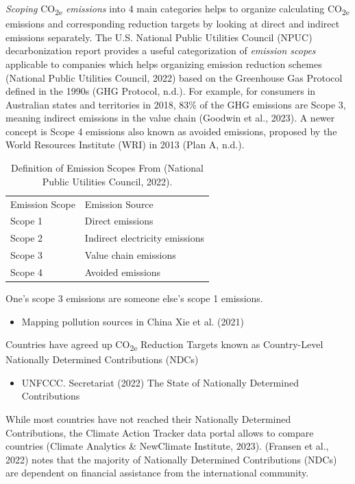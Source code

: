 \documentclass[
  letterpaper,
  DIV=11,
  numbers=noendperiod]{scrartcl}
\providecommand{\tightlist}{%
  \setlength{\itemsep}{0pt}\setlength{\parskip}{0pt}}\usepackage{longtable,booktabs,array}
\begin{document}
\emph{Scoping} CO\textsubscript{2e} \emph{emissions} into 4 main
categories helps to organize calculating CO\textsubscript{2e} emissions
and corresponding reduction targets by looking at direct and indirect
emissions separately. The U.S. National Public Utilities Council (NPUC)
decarbonization report provides a useful categorization of
\emph{emission scopes} applicable to companies which helps organizing
emission reduction schemes (National Public Utilities Council, 2022)
based on the Greenhouse Gas Protocol defined in the 1990s (GHG Protocol,
n.d.). For example, for consumers in Australian states and territories
in 2018, 83\% of the GHG emissions are Scope 3, meaning indirect
emissions in the value chain (Goodwin et al., 2023). A newer concept is
Scope 4 emissions also known as avoided emissions, proposed by the World
Resources Institute (WRI) in 2013 (Plan A, n.d.).

\begin{longtable}[]{@{}ll@{}}
\caption{Definition of Emission Scopes From (National Public Utilities
Council, 2022).}\tabularnewline
\toprule\noalign{}
\endfirsthead
\endhead
\bottomrule\noalign{}
\endlastfoot
Emission Scope & Emission Source \\
Scope 1 & Direct emissions \\
Scope 2 & Indirect electricity emissions \\
Scope 3 & Value chain emissions \\
Scope 4 & Avoided emissions \\
\end{longtable}

One's scope 3 emissions are someone else's scope 1 emissions.

\begin{itemize}
\tightlist
\item
  Mapping pollution sources in China Xie et al. (2021)
\end{itemize}

Countries have agreed up CO\textsubscript{2e} Reduction Targets known as
Country-Level Nationally Determined Contributions (NDCs)

\begin{itemize}
\tightlist
\item
  UNFCCC. Secretariat (2022) The State of Nationally Determined
  Contributions
\end{itemize}

While most countries have not reached their Nationally Determined
Contributions, the Climate Action Tracker data portal allows to compare
countries (Climate Analytics \& NewClimate Institute, 2023). (Fransen et
al., 2022) notes that the majority of Nationally Determined
Contributions (NDCs) are dependent on financial assistance from the
international community.
\end{document}
